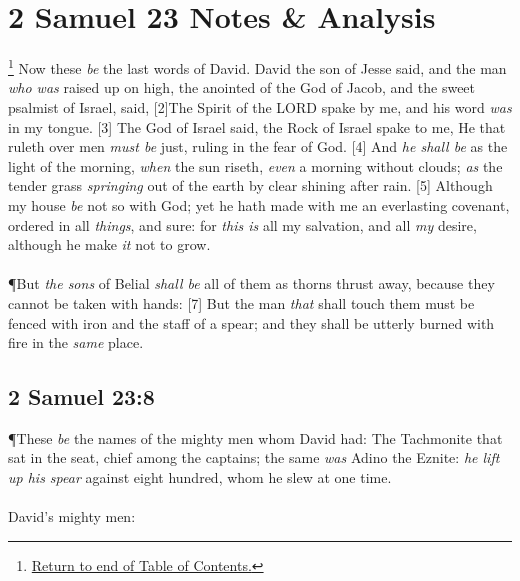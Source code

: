 \chapter{2 Samuel 23 Notes \& Analysis}
\footnote{\textcolor[rgb]{0.00,0.25,0.00}{\hyperlink{2SamuelTOC}{Return to end of Table of Contents.}}}
\textcolor[rgb]{0.00,0.00,1.00}{Now these \emph{be} the last words of David. David the son of Jesse said, and the man \emph{who was} raised up on high, the anointed of the God of Jacob, and the sweet psalmist of Israel, said,}
[2]\textcolor[rgb]{0.00,0.00,1.00}{The Spirit of the LORD spake by me, and his word \emph{was} in my tongue.}
[3] \textcolor[rgb]{0.00,0.00,1.00}{The God of Israel said, the Rock of Israel spake to me, He that ruleth over men \emph{must be} just, ruling in the fear of God.}
[4] \textcolor[rgb]{0.00,0.00,1.00}{And \emph{he shall be} as the light of the morning, \emph{when} the sun riseth, \emph{even} a morning without clouds; \emph{as} the tender grass \emph{springing} out of the earth by clear shining after rain.}
[5] \textcolor[rgb]{0.00,0.00,1.00}{Although my house \emph{be} not so with God; yet he hath made with me an everlasting covenant, ordered in all \emph{things}, and sure: for \emph{this is} all my salvation, and all \emph{my} desire, although he make \emph{it} not to grow.}\\
\\
\P \textcolor[rgb]{0.00,0.00,1.00}{But \emph{the sons} of Belial \emph{shall be} all of them as thorns thrust away, because they cannot be taken with hands:}
[7] \textcolor[rgb]{0.00,0.00,1.00}{But the man \emph{that} shall touch them must be fenced with iron and the staff of a spear; and they shall be utterly burned with fire in the \emph{same} place.}
\section{2 Samuel 23:8}
\P \textcolor[rgb]{0.00,0.00,1.00}{These \emph{be} the names of the mighty men whom David had: The Tachmonite that sat in the seat, chief among the captains; the same \emph{was} Adino the Eznite: \emph{he lift up his spear} against eight hundred, whom he slew at one time.}\\
\\
David's mighty men:

